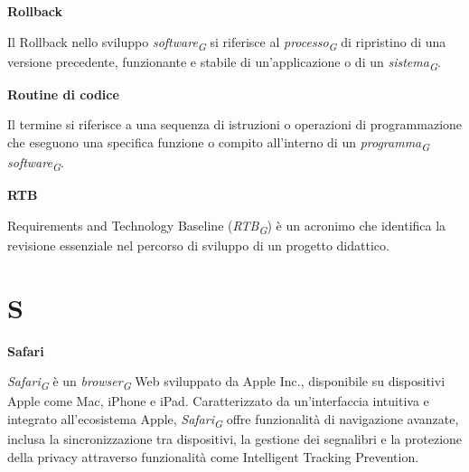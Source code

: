 \documentclass{article}
\begin{document}
\vspace{0.4cm}

\textbf{Rollback}

\vspace{0.1cm}

Il Rollback nello sviluppo \textit{software}\textsubscript{\textit{G}} si riferisce al \textit{processo}\textsubscript{\textit{G}} di ripristino di una versione precedente, funzionante e stabile di un'applicazione o di un \textit{sistema}\textsubscript{\textit{G}}.

\vspace{0.4cm}

\textbf{Routine di codice}

\vspace{0.1cm}

Il termine si riferisce a una sequenza di istruzioni o operazioni di programmazione che eseguono una specifica funzione o compito all'interno di un \textit{programma}\textsubscript{\textit{G}} \textit{software}\textsubscript{\textit{G}}.

\vspace{0.4cm}

\textbf{RTB}

\vspace{0.1cm}

Requirements and Technology Baseline (\textit{RTB}\textsubscript{\textit{G}}) è un acronimo che identifica la revisione essenziale nel percorso di sviluppo di un progetto didattico.

\pagebreak
\section*{S}
{}

\vspace{0.4cm}

\textbf{Safari}

\vspace{0.1cm}

\textit{Safari}\textsubscript{\textit{G}} è un \textit{browser}\textsubscript{\textit{G}} Web sviluppato da Apple Inc., disponibile su dispositivi Apple come Mac, iPhone e iPad. Caratterizzato da un'interfaccia intuitiva e integrato all'ecosistema Apple, \textit{Safari}\textsubscript{\textit{G}} offre funzionalità di navigazione avanzate, inclusa la sincronizzazione tra dispositivi, la gestione dei segnalibri e la protezione della privacy attraverso funzionalità come Intelligent Tracking Prevention. 
\end{document}
